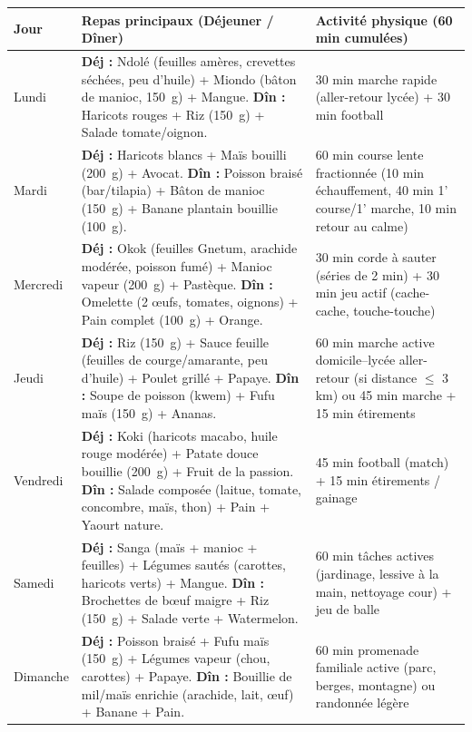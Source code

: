 \documentclass[11pt]{article}
\begin{document}
\begin{exoresolu}
\begin{center}
\begin{tabularx}{\linewidth}{|l|X|X|}
\hline
\rowcolor{popblueL} \textbf{Jour} & \textbf{Repas principaux (Déjeuner / Dîner)} & \textbf{Activité physique (60 min cumulées)} \\
\hline
Lundi & \textbf{Déj :} Ndolé (feuilles amères, crevettes séchées, peu d'huile) + Miondo (bâton de manioc, \SI{150}{g}) + Mangue. \newline \textbf{Dîn :} Haricots rouges + Riz (\SI{150}{g}) + Salade tomate/oignon. & 30 min marche rapide (aller-retour lycée) + 30 min football \\
\hline
Mardi & \textbf{Déj :} Haricots blancs + Maïs bouilli (\SI{200}{g}) + Avocat. \newline \textbf{Dîn :} Poisson braisé (bar/tilapia) + Bâton de manioc (\SI{150}{g}) + Banane plantain bouillie (\SI{100}{g}). & 60 min course lente fractionnée (10 min échauffement, 40 min 1' course/1' marche, 10 min retour au calme) \\
\hline
Mercredi & \textbf{Déj :} Okok (feuilles Gnetum, arachide modérée, poisson fumé) + Manioc vapeur (\SI{200}{g}) + Pastèque. \newline \textbf{Dîn :} Omelette (2 œufs, tomates, oignons) + Pain complet (\SI{100}{g}) + Orange. & 30 min corde à sauter (séries de 2 min) + 30 min jeu actif (cache-cache, touche-touche) \\
\hline
Jeudi & \textbf{Déj :} Riz (\SI{150}{g}) + Sauce feuille (feuilles de courge/amarante, peu d'huile) + Poulet grillé + Papaye. \newline \textbf{Dîn :} Soupe de poisson (kwem) + Fufu maïs (\SI{150}{g}) + Ananas. & 60 min marche active domicile--lycée aller-retour (si distance $\leq$ 3 km) ou 45 min marche + 15 min étirements \\
\hline
Vendredi & \textbf{Déj :} Koki (haricots macabo, huile rouge modérée) + Patate douce bouillie (\SI{200}{g}) + Fruit de la passion. \newline \textbf{Dîn :} Salade composée (laitue, tomate, concombre, maïs, thon) + Pain + Yaourt nature. & 45 min football (match) + 15 min étirements / gainage \\
\hline
Samedi & \textbf{Déj :} Sanga (maïs + manioc + feuilles) + Légumes sautés (carottes, haricots verts) + Mangue. \newline \textbf{Dîn :} Brochettes de bœuf maigre + Riz (\SI{150}{g}) + Salade verte + Watermelon. & 60 min tâches actives (jardinage, lessive à la main, nettoyage cour) + jeu de balle \\
\hline
Dimanche & \textbf{Déj :} Poisson braisé + Fufu maïs (\SI{150}{g}) + Légumes vapeur (chou, carottes) + Papaye. \newline \textbf{Dîn :} Bouillie de mil/maïs enrichie (arachide, lait, œuf) + Banane + Pain. & 60 min promenade familiale active (parc, berges, montagne) ou randonnée légère \\
\hline
\end{tabularx}
\end{center}


\end{exoresolu}
\end{document}
